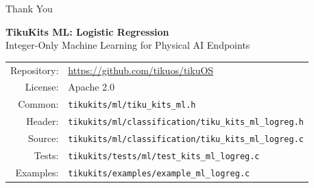 \documentclass[aspectratio=169, 10pt]{beamer}
\begin{document}
\begin{frame}{Thank You}
\begin{center}
\Large\textbf{TikuKits ML: Logistic Regression}\\[0.5em]
\normalsize Integer-Only Machine Learning for Physical AI Endpoints\\[1.5em]

\begin{tabular}{rl}
  Repository: & \url{https://github.com/tikuos/tikuOS} \\
  License:    & Apache 2.0 \\
  Common:     & \texttt{tikukits/ml/tiku\_kits\_ml.h} \\
  Header:     & \texttt{tikukits/ml/classification/tiku\_kits\_ml\_logreg.h} \\
  Source:     & \texttt{tikukits/ml/classification/tiku\_kits\_ml\_logreg.c} \\
  Tests:      & \texttt{tikukits/tests/ml/test\_kits\_ml\_logreg.c} \\
  Examples:   & \texttt{tikukits/examples/example\_ml\_logreg.c} \\
\end{tabular}
\end{center}
\end{frame}
\end{document}
